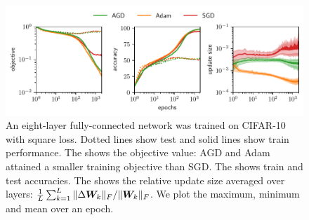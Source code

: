 \begin{figure}
    \centering
    \includegraphics[width=\textwidth]{figures/pdf/plot2}
    \caption{ An eight-layer fully-connected network was trained on CIFAR-10 with square loss. Dotted lines show test and solid lines show train performance.
    The  shows the objective value: AGD and Adam attained a smaller training objective than SGD. The  shows train and test accuracies. The  shows the relative update size averaged over layers: $\tfrac{1}{L}\sum_{k=1}^L \Vert {\Delta {\bm{W}}_k} \Vert_F/\Vert {{\bm{W}}_k} \Vert_F$. We plot the maximum, minimum and mean over an epoch.} \label{fig:2}
\end{figure}